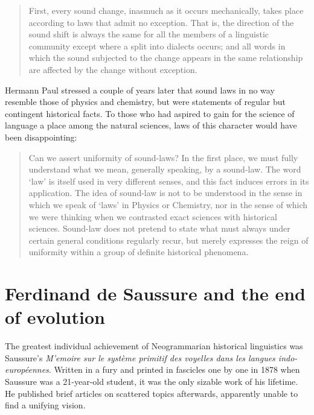 \documentclass[output=paper,
modfonts
]{LSP/langsci}
\begin{document}
\begin{quote}
First, every sound change, inasmuch as it occurs mechanically, takes place according to laws that admit no exception. That is, the direction of the sound shift is always the same for all the members of a linguistic community except where a split into dialects occurs; and all words in which the sound subjected to the change appears in the same relationship are affected by the change without exception. \citep[204]{osthoffandbrugmann1878}
\end{quote}

Hermann Paul stressed a couple of years later that sound laws in no way resemble those of physics and chemistry, but were statements of regular but contingent historical facts. To those who had aspired to gain for the science of language a place among the natural sciences, laws of this character would have been disappointing:

\begin{quote}
Can we assert uniformity of sound-laws? In the first place, we must fully understand what we mean, generally speaking, by a sound-law. The word ‘law' is itself used in very different senses, and this fact induces errors in its application. The idea of sound-law is not to be understood in the sense in which we speak of ‘laws' in Physics or Chemistry, nor in the sense of which we were thinking when we contrasted exact sciences with historical sciences. Sound-law does not pretend to state what must always under certain general conditions regularly recur, but merely expresses the reign of uniformity within a group of definite historical phenomena. \citep[57]{Paul1880}
\end{quote}

\section{Ferdinand de Saussure and the end of evolution}

The greatest individual achievement of Neogrammarian historical linguistics was Saussure's \emph{M'emoire sur le syst\`eme primitif des voyelles dans les langues indo-europ\'eennes}.  Written in a fury and printed in fascicles one by one in 1878 when Saussure was a 21-year-old student, it was the only sizable work of his lifetime. He published brief articles on scattered topics afterwards, apparently unable to find a unifying vision.
\end{document}
